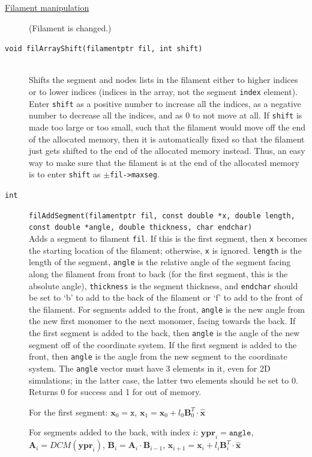 \documentclass {scrbook}
\newcommand {\ttt} {\texttt}
\begin{document}
\begin{description}
\item[\underline{Filament manipulation}]
(Filament is changed.)

\item[\ttt{void filArrayShift(filamentptr fil, int shift)}]
\hfill \\
Shifts the segment and nodes lists in the filament either to higher indices or to lower indices (indices in the array, not the segment \ttt{index} element). Enter \ttt{shift} as a positive number to increase all the indices, as a negative number to decrease all the indices, and as 0 to not move at all. If \ttt{shift} is made too large or too small, such that the filament would move off the end of the allocated memory, then it is automatically fixed so that the filament just gets shifted to the end of the allocated memory instead. Thus, an easy way to make sure that the filament is at the end of the allocated memory is to enter \ttt{shift} as $\pm$\ttt{fil->maxseg}.

\item[\ttt{int}]
\ttt{filAddSegment(filamentptr fil, const double *x, double length, const double *angle, double thickness, char endchar)}
\hfill \\
Adds a segment to filament \ttt{fil}. If this is the first segment, then \ttt{x} becomes the starting location of the filament; otherwise, \ttt{x} is ignored. \ttt{length} is the length of the segment, \ttt{angle} is the relative angle of the segment facing along the filament from front to back (for the first segment, this is the absolute angle), \ttt{thickness} is the segment thickness, and \ttt{endchar} should be set to `b' to add to the back of the filament or `f' to add to the front of the filament. For segments added to the front, \ttt{angle} is the new angle from the new first monomer to the next monomer, facing towards the back. If the first segment is added to the back, then \ttt{angle} is the angle of the new segment off of the coordinate system. If the first segment is added to the front, then \ttt{angle} is the angle from the new segment to the coordinate system. The \ttt{angle} vector must have 3 elements in it, even for 2D simulations; in the latter case, the latter two elements should be set to 0. Returns 0 for success and 1 for out of memory.

For the first segment:
$\bm{x}_0=\ttt{x}$, 
$\bm{x}_1=\bm{x}_0 + l_0 \bm{B}^T_0 \cdot \bm{\hat{x}}$

For segments added to the back, with index $i$:
$\bm{ypr}_i = \ttt{angle}$, 
$\bm{A}_i = DCM(\bm{ypr}_i)$, 
$\bm{B}_i = \bm{A}_i \cdot \bm{B}_{i-1}$, 
$\bm{x}_{i+1} = \bm{x}_i + l_i \bm{B}^T_i \cdot \bm{\hat{x}}$


\end{description}
\end{document}
